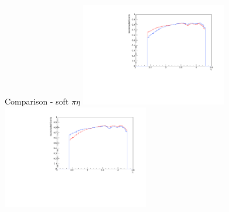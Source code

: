 \documentclass[11pt]{beamer}
\begin{document}
\begin{frame}{Comparison - soft $\pi \eta$}
\centering
\includegraphics[width=0.48\textwidth]{first/up_pdf/combined/h_eta_reco_SPi.pdf}
\includegraphics[width=0.48\textwidth]{first/down_pdf/combined/h_eta_reco_SPi.pdf}
\end{frame}
\end{document}
